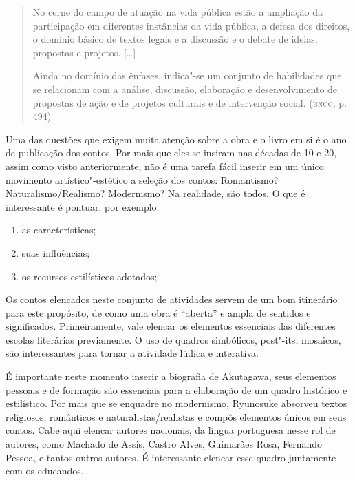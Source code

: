 \documentclass[12pt]{extarticle}
\begin{document}
\begin{quote}
No cerne do campo de atuação na vida pública estão a ampliação da
participação em diferentes instâncias da vida pública, a defesa dos
direitos, o domínio básico de textos legais e a discussão e o debate de
ideias, propostas e projetos. {[}\ldots{}{]}

Ainda no domínio das ênfases, indica"-se um conjunto de habilidades que
se relacionam com a análise, discussão, elaboração e desenvolvimento de
propostas de ação e de projetos culturais e de intervenção social.
(\textsc{bncc}, p. 494)
\end{quote}

Uma das questões que exigem muita atenção sobre a obra e o livro em si
é o ano de publicação dos contos. Por mais que eles se insiram nas
décadas de 10 e 20, assim como visto anteriormente, não é uma tarefa
fácil inserir em um único movimento artístico"-estético a seleção dos
contos: Romantismo? Naturalismo/Realismo? Modernismo? Na realidade,
são todos. O que é interessante é pontuar, por exemplo:

\begin{enumerate}
\item
  as características;
\item
  suas influências;
\item
  os recursos estilísticos adotados;
\end{enumerate}

Os contos elencados neste conjunto de atividades servem de um bom
itinerário para este propósito, de como uma obra é ``aberta'' e ampla de
sentidos e significados. Primeiramente, vale elencar os elementos
essenciais das diferentes escolas literárias previamente. O uso de
quadros simbólicos, post"-its, mosaicos, são interessantes para tornar a
atividade lúdica e interativa.

É importante neste momento inserir a biografia de Akutagawa, seus
elementos pessoais e de formação são essenciais para a elaboração de um
quadro histórico e estilístico. Por mais que se enquadre no modernismo,
Ryunosuke absorveu textos religiosos, românticos e
naturalistas/realistas e compôs elementos únicos em seus contos. Cabe
aqui elencar autores nacionais, da língua portuguesa nesse rol de
autores, como Machado de Assis, Castro Alves, Guimarães Rosa, Fernando
Pessoa, e tantos outros autores. É interessante elencar esse quadro
juntamente com os educandos.

\end{document}
